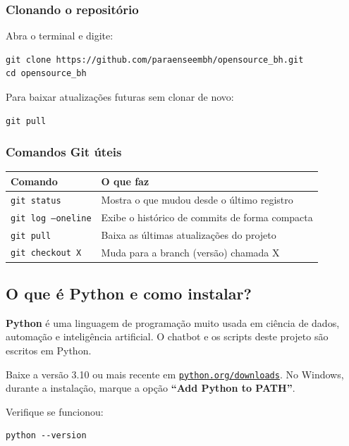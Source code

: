 \documentclass[12pt,a4paper]{article}
\begin{document}
\subsubsection{Clonando o repositório}

Abra o terminal e digite:

\begin{lstlisting}
git clone https://github.com/paraenseembh/opensource_bh.git
cd opensource_bh
\end{lstlisting}

Para baixar atualizações futuras sem clonar de novo:

\begin{lstlisting}
git pull
\end{lstlisting}

\subsubsection{Comandos Git úteis}

\begin{tabularx}{\linewidth}{lX}
  \toprule
  \textbf{Comando} & \textbf{O que faz} \\
  \midrule
  \texttt{git status}        & Mostra o que mudou desde o último registro \\
  \texttt{git log --oneline} & Exibe o histórico de commits de forma compacta \\
  \texttt{git pull}          & Baixa as últimas atualizações do projeto \\
  \texttt{git checkout X}    & Muda para a branch (versão) chamada X \\
  \bottomrule
\end{tabularx}

\subsection{O que é Python e como instalar?}

\textbf{Python} é uma linguagem de programação muito usada em ciência de dados, automação e inteligência artificial. O chatbot e os scripts deste projeto são escritos em Python.

Baixe a versão 3.10 ou mais recente em \href{https://python.org/downloads}{\texttt{python.org/downloads}}. No Windows, durante a instalação, marque a opção \textbf{``Add Python to PATH''}.

Verifique se funcionou:

\begin{lstlisting}
python --version
\end{lstlisting}
\end{document}
